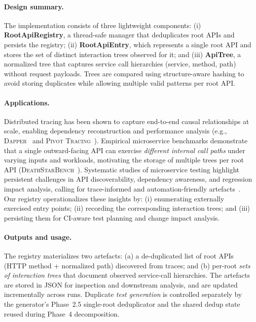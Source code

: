 \documentclass[conference]{IEEEtran}
\begin{document}
\paragraph{Design summary.}
The implementation consists of three lightweight components: (i) \textbf{RootApiRegistry}, a thread-safe manager that deduplicates root APIs and persists the registry; (ii) \textbf{RootApiEntry}, which represents a single root API and stores the set of distinct interaction trees observed for it; and (iii) \textbf{ApiTree}, a normalized tree that captures service call hierarchies (service, method, path) without request payloads. Trees are compared using structure-aware hashing to avoid storing duplicates while allowing multiple valid patterns per root API.

\paragraph{Applications.}
Distributed tracing has been shown to capture end-to-end causal relationships at scale, enabling dependency reconstruction and performance analysis (e.g., \textsc{Dapper}~\cite{sigelman2010dapper} and \textsc{Pivot Tracing}~\cite{mace2015pivot}). Empirical microservice benchmarks demonstrate that a single outward-facing API can exercise \emph{different internal call paths} under varying inputs and workloads, motivating the storage of multiple trees per root API (\textsc{DeathStarBench}~\cite{gan2020deathstarbench}). Systematic studies of microservice testing highlight persistent challenges in API discoverability, dependency awareness, and regression impact analysis, calling for trace-informed and automation-friendly artefacts~\cite{waseem2020testing}. Our registry operationalizes these insights by: (i) enumerating externally exercised entry points; (ii) recording the corresponding interaction trees; and (iii) persisting them for CI-aware test planning and change impact analysis.

\paragraph{Outputs and usage.}
The registry materializes two artefacts: (a) a de-duplicated list of root APIs (HTTP method + normalized path) discovered from traces; and (b) per-root \emph{sets of interaction trees} that document observed service-call hierarchies. The artefacts are stored in JSON for inspection and downstream analysis, and are updated incrementally across runs. Duplicate \emph{test generation} is controlled separately by the generator's Phase~2.5 single-root deduplicator and the shared dedup state reused during Phase~4 decomposition.
\end{document}
